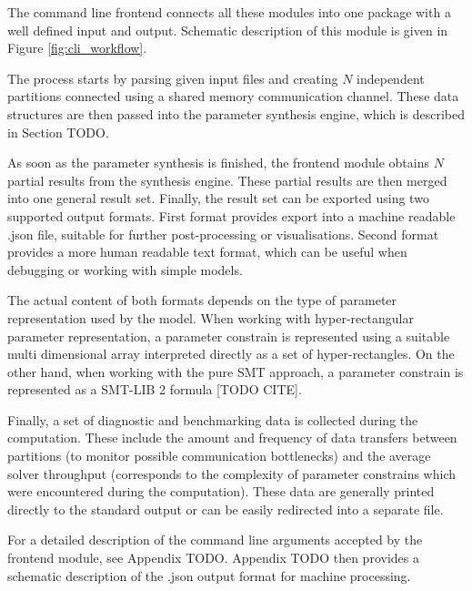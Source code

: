 The command line frontend connects all these modules into one package with a well defined input and output. Schematic description of this module is given in Figure \ref{fig:cli_workflow}.

The process starts by parsing given input files and creating $N$ independent partitions connected using a shared memory communication channel. These data structures are then passed into the parameter synthesis engine, which is described in Section TODO.

As soon as the parameter synthesis is finished, the frontend module obtains $N$ partial results from the synthesis engine. These partial results are then merged into one general result set. Finally, the result set can be exported using two supported output formats. First format provides export into a machine readable .json file, suitable for further post-processing or visualisations. Second format provides a more human readable text format, which can be useful when debugging or working with simple models.

The actual content of both formats depends on the type of parameter representation used by the model. When working with hyper-rectangular parameter representation, a parameter constrain is represented using a suitable multi dimensional array interpreted directly as a set of hyper-rectangles. On the other hand, when working with the pure SMT approach, a parameter constrain is represented as a SMT-LIB 2 formula [TODO CITE].

Finally, a set of diagnostic and benchmarking data is collected during the computation. These include the amount and frequency of data transfers between partitions (to monitor possible communication bottlenecks) and the average solver throughput (corresponds to the complexity of parameter constrains which were encountered during the computation). These data are generally printed directly to the standard output or can be easily redirected into a separate file.

For a detailed description of the command line arguments accepted by the frontend module, see Appendix TODO. Appendix TODO then provides a schematic description of the .json output format for machine processing.

